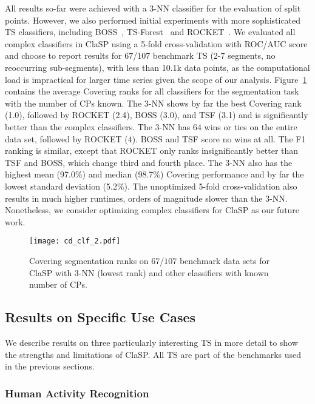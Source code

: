 \documentclass[pdflatex,sn-basic]{sn-jnl}
\begin{document}
All results so-far were achieved with a 3-NN classifier for the evaluation of split points. However, we also performed initial experiments with more sophisticated TS classifiers, including BOSS~\citep{schafer2014boss}, TS-Forest~\citep{deng2013time} and ROCKET~\citep{dempster2020rocket}. We evaluated all complex classifiers in ClaSP using a 5-fold cross-validation with ROC/AUC score and choose to report results for $67$/$107$ benchmark TS (2-7 segments, no reoccurring sub-segments), with less than 10.1k data points, as the computational load is impractical for larger time series given the scope of our analysis. Figure~\ref{fig:cd_clf} contains the average Covering ranks for all classifiers for the segmentation task with the number of CPs known. The 3-NN shows by far the best Covering rank (1.0), followed by ROCKET (2.4), BOSS (3.0), and TSF (3.1) and is significantly better than the complex classifiers. The 3-NN has $64$ wins or ties on the entire data set, followed by ROCKET ($4$). BOSS and TSF score no wins at all. The F1 ranking is similar, except that ROCKET only ranks insignificantly better than TSF and BOSS, which change third and fourth place. The 3-NN also has the highest mean (97.0\%) and median (98.7\%) Covering performance and by far the lowest standard deviation (5.2\%). The unoptimized 5-fold cross-validation also results in much higher runtimes, orders of magnitude slower than the 3-NN. Nonetheless, we consider optimizing complex classifiers for ClaSP as our future work.

\begin{figure}[t]
	\texttt{[image: cd\_clf\_2.pdf]}
	\caption{Covering segmentation ranks on $67$/$107$ benchmark data sets for ClaSP with 3-NN (lowest rank) and other classifiers with known number of CPs.\label{fig:cd_clf}
	}
\end{figure}


\subsection{Results on Specific Use Cases}\label{sec:use_cases}

We describe results on three particularly interesting TS in more detail to show the strengths and limitations of ClaSP. All TS are part of the benchmarks used in the previous sections. 

\subsubsection*{Human Activity Recognition}
\end{document}
